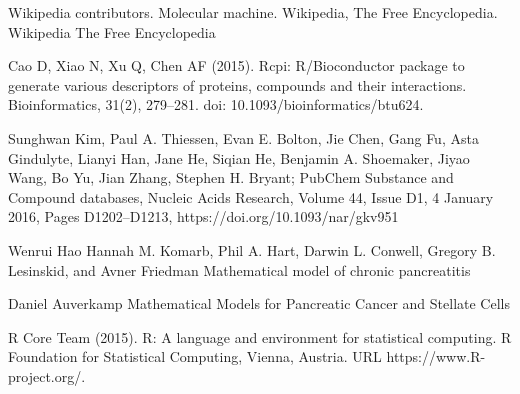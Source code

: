 
\begin{thebibliography}{00}

Wikipedia contributors. 
\newblock Molecular machine. 
\newblock Wikipedia, The Free Encyclopedia. Wikipedia The Free Encyclopedia

Cao D, Xiao N, Xu Q, Chen AF (2015). 
\newblock Rcpi: R/Bioconductor package to generate various descriptors of proteins, compounds and their interactions. 
\newblock Bioinformatics, 31(2), 279–281. doi: 10.1093/bioinformatics/btu624. 

Sunghwan Kim, Paul A. Thiessen, Evan E. Bolton, Jie Chen, Gang Fu, Asta Gindulyte, Lianyi Han, Jane He, Siqian He, Benjamin A. Shoemaker, Jiyao Wang, Bo Yu, Jian Zhang, Stephen H. Bryant; 
\newblock PubChem Substance and Compound databases, 
\newblock Nucleic Acids Research, Volume 44, Issue D1, 4 January 2016, Pages D1202–D1213, https://doi.org/10.1093/nar/gkv951

Wenrui Hao  Hannah M. Komarb, Phil A. Hart, Darwin L. Conwell, Gregory B. Lesinskid, and Avner Friedman
\newblock Mathematical model of chronic pancreatitis

Daniel  Auverkamp
\newblock Mathematical  Models  for  Pancreatic  Cancer  and Stellate  Cells

R Core Team (2015). 
\newblock R: A language and environment for statistical computing. R Foundation for Statistical Computing, Vienna, Austria.
\newblock URL https://www.R-project.org/.

\end{thebibliography}

